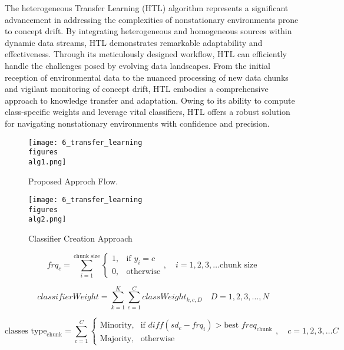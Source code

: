 The heterogeneous Transfer Learning (HTL) algorithm represents a significant advancement in addressing the complexities of nonstationary environments prone to concept drift. By integrating heterogeneous and homogeneous sources within dynamic data streams, HTL demonstrates remarkable adaptability and effectiveness. Through its meticulously designed workflow, HTL can efficiently handle the challenges posed by evolving data landscapes. From the initial reception of environmental data to the nuanced processing of new data chunks and vigilant monitoring of concept drift, HTL embodies a comprehensive approach to knowledge transfer and adaptation. Owing to its ability to compute class-specific weights and leverage vital classifiers, HTL offers a robust solution for navigating nonstationary environments with confidence and precision.


\begin{figure}[!ht]
	\centering
	\texttt{[image: 6\_transfer\_learning\\figures\\alg1.png]}
	\caption{Proposed Approch Flow.}
	\label{fig:6_alg1}
\end{figure}
\begin{figure}[!ht]
	\centering
	\texttt{[image: 6\_transfer\_learning\\figures\\alg2.png]}
	\caption{Classifier Creation Approach}
	\label{fig:6_alg2}
\end{figure}

\begin{equation}
	\label{eq:4_first_proposal_1}
    frq_{c} = \sum_{i=1}^{\text{chunk size}} \begin{cases} 
    1, & \text{if } y_i = c \\
    0, & \text{otherwise}
    \end{cases}, \quad i = 1, 2, 3, \dots \text{chunk size}\;
\end{equation}

\begin{equation}
	\label{eq:4_first_proposal_2}
	classifierWeight = \sum_{k=1}^{K} \sum_{c=1}^{C} classWeight_{k,c,D} \quad D = 1, 2, 3, \dots, N
\end{equation}

\begin{equation}
	\label{eq:4_first_proposal_3}
    \text{classes type}_{\text{chunk}} = \sum_{c=1}^{C} \begin{cases} 
    \text{Minority,} & \text{if } diff(sd_c - frq_i) > \text{best } freq_{\text{chunk}} \\
    \text{Majority,} & \text{otherwise}
    \end{cases}, \quad c = 1, 2, 3, \dots C
\end{equation}


